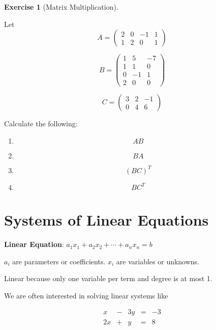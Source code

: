 \documentclass[
]{book}
\providecommand{\tightlist}{%
  \setlength{\itemsep}{0pt}\setlength{\parskip}{0pt}}
\theoremstyle{definition}
\theoremstyle{definition}
\theoremstyle{definition}
\newtheorem{exercise}{Exercise}[chapter]
\theoremstyle{definition}
\theoremstyle{remark}
\begin{document}
\begin{exercise}[Matrix Multiplication]
\protect\hypertarget{exr:matrixmulti1}{}{\label{exr:matrixmulti1} {} }

Let \[A =  \begin{pmatrix} 2&0&-1&1\\1&2&0&1 \end{pmatrix}\]

\[B = \begin{pmatrix} 1&5&-7\\1&1&0\\0&-1&1\\2&0&0\end{pmatrix} \]

\[C =  \begin{pmatrix} 3&2&-1\\0&4&6 \end{pmatrix}\]

Calculate the following:

\begin{enumerate}
\def\labelenumi{\arabic{enumi}.}
\tightlist
\item
  \[AB\]
\item
  \[BA\]
\item
  \[(BC)^T\]
\item
  \[BC^T\]
\end{enumerate}
\end{exercise}

\hypertarget{systems-of-linear-equations}{%
\section{Systems of Linear Equations}\label{systems-of-linear-equations}}

\textbf{Linear Equation}: \(a_1 x_1 + a_2 x_2 + \cdots + a_n x_n = b\)

\(a_i\) are parameters or coefficients. \(x_i\) are variables or unknowns.

Linear because only one variable per term and degree is at most 1.

We are often interested in solving linear systems like

\[\begin{matrix}
            x  & - & 3y & = & -3\\
            2x & + &  y & = &  8
            \end{matrix}\]

\end{document}
